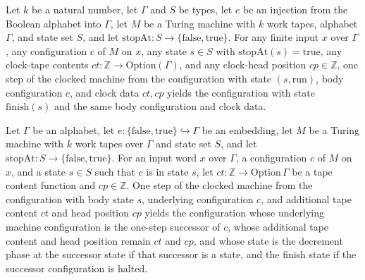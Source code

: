 \begin{theorem}
\label{Turing.sc_stop_step}
\leanok
{}
Let $k$ be a natural number, let $\Gamma$ and $S$ be types, let $e$ be an injection from
the Boolean alphabet into $\Gamma$, let $M$ be a Turing machine with $k$ work tapes,
alphabet $\Gamma$, and state set $S$, and let
$\mathrm{stopAt}:S\to\{\mathrm{false},\mathrm{true}\}$. For any finite input $x$ over
$\Gamma$, any configuration $c$ of $M$ on $x$, any state $s\in S$ with
$\mathrm{stopAt}(s)=\mathrm{true}$, any clock-tape contents $ct:\mathbb
Z\to\mathrm{Option}(\Gamma)$, and any clock-head position $cp\in\mathbb Z$, one step of
the clocked machine from the configuration with state $(s,\mathrm{run})$, body
configuration $c$, and clock data $ct,cp$ yields the configuration with state
$\mathrm{finish}(s)$ and the same body configuration and clock data.
\end{theorem}

\begin{theorem}
\label{Turing.sc_body_step}
\leanok
{}
Let $\Gamma$ be an alphabet, let
$e:\{\mathrm{false},\mathrm{true}\}\hookrightarrow\Gamma$ be an embedding, let $M$ be a
Turing machine with $k$ work tapes over $\Gamma$ and state set $S$, and let
$\mathrm{stopAt}:S\to\{\mathrm{false},\mathrm{true}\}$. For an input word $x$ over
$\Gamma$, a configuration $c$ of $M$ on $x$, and a state $s\in S$ such that $c$ is in
state $s$, let $ct:\mathbb{Z}\to\mathrm{Option}\,\Gamma$ be a tape content function and
$cp\in\mathbb{Z}$. One step of the clocked machine from the configuration with body
state $s$, underlying configuration $c$, and additional tape content $ct$ and head
position $cp$ yields the configuration whose underlying machine configuration is the
one-step successor of $c$, whose additional tape content and head position remain $ct$
and $cp$, and whose state is the decrement phase at the successor state if that
successor is a state, and the finish state if the successor configuration is halted.
\end{theorem}

